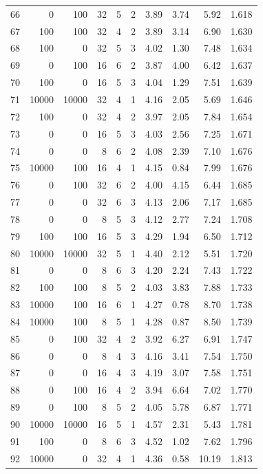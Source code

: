 \begin{footnotesize}
\begin{longtable}{@{}rrrrrrrrrr@{}}
66 & 0 & 100 & 32 & 5 & 2 & 3.89 & 3.74 & 5.92 & 1.618 \\
67 & 100 & 100 & 32 & 4 & 2 & 3.89 & 3.14 & 6.90 & 1.630 \\
68 & 100 & 0 & 32 & 5 & 3 & 4.02 & 1.30 & 7.48 & 1.634 \\
69 & 0 & 100 & 16 & 6 & 2 & 3.87 & 4.00 & 6.42 & 1.637 \\
70 & 100 & 0 & 16 & 5 & 3 & 4.04 & 1.29 & 7.51 & 1.639 \\
71 & 10000 & 10000 & 32 & 4 & 1 & 4.16 & 2.05 & 5.69 & 1.646 \\
72 & 100 & 0 & 32 & 4 & 2 & 3.97 & 2.05 & 7.84 & 1.654 \\
73 & 0 & 0 & 16 & 5 & 3 & 4.03 & 2.56 & 7.25 & 1.671 \\
74 & 0 & 0 & 8 & 6 & 2 & 4.08 & 2.39 & 7.10 & 1.676 \\
75 & 10000 & 100 & 16 & 4 & 1 & 4.15 & 0.84 & 7.99 & 1.676 \\
76 & 0 & 100 & 32 & 6 & 2 & 4.00 & 4.15 & 6.44 & 1.685 \\
77 & 0 & 0 & 32 & 6 & 3 & 4.13 & 2.06 & 7.17 & 1.685 \\
78 & 0 & 0 & 8 & 5 & 3 & 4.12 & 2.77 & 7.24 & 1.708 \\
79 & 100 & 100 & 16 & 5 & 3 & 4.29 & 1.94 & 6.50 & 1.712 \\
80 & 10000 & 10000 & 32 & 5 & 1 & 4.40 & 2.12 & 5.51 & 1.720 \\
81 & 0 & 0 & 8 & 6 & 3 & 4.20 & 2.24 & 7.43 & 1.722 \\
82 & 100 & 100 & 8 & 5 & 2 & 4.03 & 3.83 & 7.88 & 1.733 \\
83 & 10000 & 100 & 16 & 6 & 1 & 4.27 & 0.78 & 8.70 & 1.738 \\
84 & 10000 & 100 & 8 & 5 & 1 & 4.28 & 0.87 & 8.50 & 1.739 \\
85 & 0 & 100 & 32 & 4 & 2 & 3.92 & 6.27 & 6.91 & 1.747 \\
86 & 0 & 0 & 8 & 4 & 3 & 4.16 & 3.41 & 7.54 & 1.750 \\
87 & 0 & 0 & 16 & 4 & 3 & 4.19 & 3.07 & 7.58 & 1.751 \\
88 & 0 & 100 & 16 & 4 & 2 & 3.94 & 6.64 & 7.02 & 1.770 \\
89 & 0 & 100 & 8 & 5 & 2 & 4.05 & 5.78 & 6.87 & 1.771 \\
90 & 10000 & 10000 & 16 & 5 & 1 & 4.57 & 2.31 & 5.43 & 1.781 \\
91 & 100 & 0 & 8 & 6 & 3 & 4.52 & 1.02 & 7.62 & 1.796 \\
92 & 10000 & 0 & 32 & 4 & 1 & 4.36 & 0.58 & 10.19 & 1.813 \\

\end{longtable}
\end{footnotesize}
